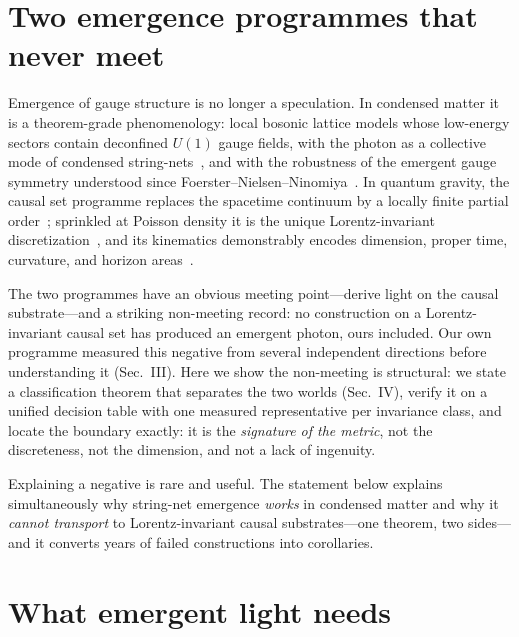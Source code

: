 \documentclass[aps,prd,reprint,nofootinbib,superscriptaddress,floatfix]{revtex4-2}
\begin{document}
\maketitle

\section{Two emergence programmes that never meet}

Emergence of gauge structure is no longer a speculation. In condensed matter it is a
theorem-grade phenomenology: local bosonic lattice models whose low-energy sectors contain
deconfined $U(1)$ gauge fields, with the photon as a collective mode of condensed
string-nets~\cite{LevinWen2005,LevinWenColloquium,WenBook,MotrunichSenthil2002}, and with
the robustness of the emergent gauge symmetry understood since
Foerster--Nielsen--Ninomiya~\cite{FNN1980}. In quantum gravity, the causal set programme
replaces the spacetime continuum by a locally finite partial
order~\cite{BLMS1987,Surya2019}; sprinkled at Poisson density it is the unique
Lorentz-invariant discretization~\cite{BHS2009}, and its kinematics demonstrably encodes
dimension, proper time, curvature, and horizon areas~\cite{Surya2019,Barton2019}.

The two programmes have an obvious meeting point---derive light on the causal
substrate---and a striking non-meeting record: no construction on a Lorentz-invariant
causal set has produced an emergent photon, ours included. Our own programme measured
this negative from several independent directions before understanding it (Sec.~III).
Here we show the non-meeting is structural: we state a classification theorem that
separates the two worlds (Sec.~IV), verify it on a unified decision table with one
measured representative per invariance class, and locate the boundary exactly: it is
the \emph{signature of the metric}, not the discreteness, not the dimension, and not a
lack of ingenuity.

Explaining a negative is rare and useful. The statement below explains simultaneously why
string-net emergence \emph{works} in condensed matter and why it \emph{cannot transport}
to Lorentz-invariant causal substrates---one theorem, two sides---and it converts years
of failed constructions into corollaries.

\section{What emergent light needs}
\end{document}
